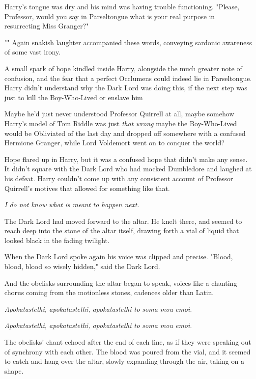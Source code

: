 Harry's tongue was dry and his mind was having trouble functioning. "Please,
Professor, would you say in Parseltongue what is your real purpose in
resurrecting Miss Granger?"

"" Again snakish laughter
accompanied these words, conveying sardonic awareness of some vast irony.

A small spark of hope kindled inside Harry, alongside the much greater note of
confusion, and the fear that a perfect Occlumens could indeed lie in
Parseltongue. Harry didn't understand why the Dark Lord was doing this, if the
next step was just to kill the Boy-Who-Lived or enslave him{\el}

Maybe he'd just never understood Professor Quirrell at all, maybe somehow
Harry's model of Tom Riddle was just \emph{that wrong}{\el} maybe the
Boy-Who-Lived would be Obliviated of the last day and dropped off somewhere
with a confused Hermione Granger, while Lord Voldemort went on to conquer the
world{\el}?

Hope flared up in Harry, but it was a confused hope that didn't make any sense.
It didn't square with the Dark Lord who had mocked Dumbledore and laughed at
his defeat. Harry couldn't come up with any consistent account of Professor
Quirrell's motives that allowed for something like that.

\emph{I do not know what is meant to happen next.}

The Dark Lord had moved forward to the altar. He knelt there, and seemed to
reach deep into the stone of the altar itself, drawing forth a vial of liquid
that looked black in the fading twilight.

When the Dark Lord spoke again his voice was clipped and precise. "Blood,
blood, blood so wisely hidden," said the Dark Lord.

And the obelisks surrounding the altar began to speak, voices like a chanting
chorus coming from the motionless stones, cadences older than Latin.

\emph{Apokatastethi, apokatastethi, apokatastethi to soma mou emoi.}

\emph{Apokatastethi, apokatastethi, apokatastethi to soma mou emoi.}

The obelisks' chant echoed after the end of each line, as if they were speaking
out of synchrony with each other. The blood was poured from the vial, and it
seemed to catch and hang over the altar, slowly expanding through the air,
taking on a shape.


